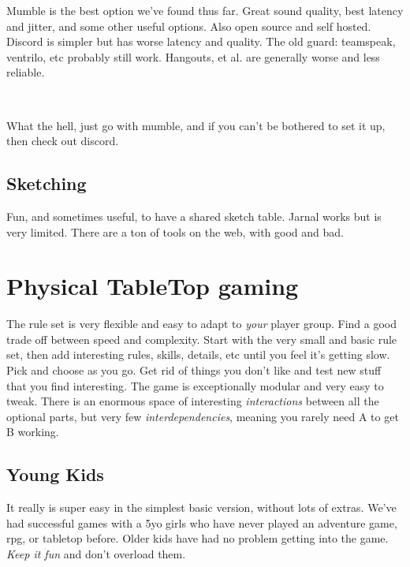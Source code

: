 Mumble is the best option we've found thus far. Great sound quality, best latency and jitter, and some other useful options. Also open source and self hosted. Discord is simpler but has worse latency and quality. The old guard: teamspeak, ventrilo, etc probably still work. Hangouts, et al. are generally worse and less reliable.

\

What the hell, just go with mumble, and if you can't be bothered to set it up, then check out discord.


\subsection*{Sketching} Fun, and sometimes useful, to have a shared sketch table. Jarnal works but is very limited. There are a ton of tools on the web, with good and bad.










\clearpage %

\section*{Physical TableTop gaming}

The rule set is very flexible and easy to adapt to \emph{your} player group. Find a good trade off between speed and complexity. Start with the very small and basic rule set, then add interesting rules, skills, details, etc until you feel it's getting slow. Pick and choose as you go. Get rid of things you don't like and test new stuff that you find interesting. The game is exceptionally modular and very easy to tweak. There is an enormous space of interesting \emph{interactions} between all the optional parts, but very few \emph{interdependencies}, meaning you rarely need A to get B working.


\subsection*{Young Kids} 

It really is super easy in the simplest basic version, without lots of extras. We've had successful games with a 5yo girls who have never played an adventure game, rpg, or tabletop before. Older kids have had no problem getting into the game. \emph{Keep it fun} and don't overload them.

